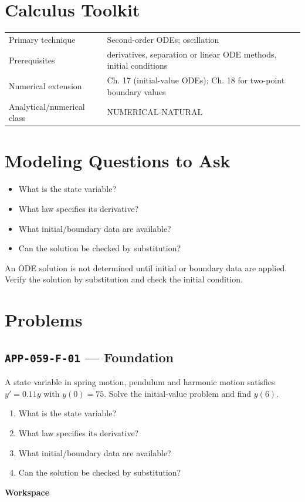 \documentclass[11pt]{book}
\newcommand{\pid}[1]{\texttt{#1}}
\newcommand{\workspace}{\par\vspace{0.7in}\hrulefill\par\vspace{0.55in}\hrulefill\par}
\begin{document}
\section*{Calculus Toolkit}
\begin{tabularx}{\textwidth}{@{}lX@{}}\toprule
Primary technique & Second-order ODEs; oscillation \\
Prerequisites & derivatives, separation or linear ODE methods, initial conditions \\
Numerical extension & Ch. 17 (initial-value ODEs); Ch. 18 for two-point boundary values \\
Analytical/numerical class & NUMERICAL-NATURAL \\
\bottomrule\end{tabularx}
\section*{Modeling Questions to Ask}\begin{itemize}
\item What is the state variable?
\item What law specifies its derivative?
\item What initial/boundary data are available?
\item Can the solution be checked by substitution?
\end{itemize}
\begin{errorbox}An ODE solution is not determined until initial or boundary data are applied. Verify the solution by substitution and check the initial condition.\end{errorbox}
\section*{Problems}
\subsection*{\pid{APP-059-F-01} — Foundation}
\begin{problembox}
A state variable in spring motion, pendulum and harmonic motion satisfies $y'=0.11y$ with $y(0)=75$. Solve the initial-value problem and find $y(6)$.
\end{problembox}
\begin{promptbox}\begin{enumerate}
\item What is the state variable?
\item What law specifies its derivative?
\item What initial/boundary data are available?
\item Can the solution be checked by substitution?
\end{enumerate}\end{promptbox}
\textbf{Workspace}\workspace
{}
\end{document}
